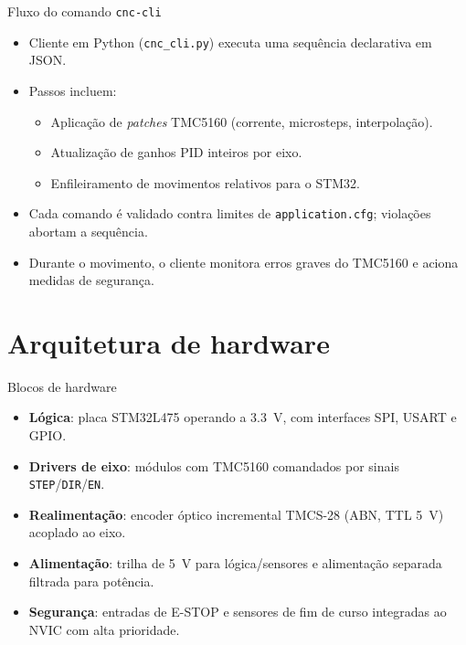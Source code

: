 \documentclass{beamer}
\begin{document}
\begin{frame}{Fluxo do comando \texttt{cnc-cli}}
  \begin{itemize}
    \item Cliente em Python (\texttt{cnc\_cli.py}) executa uma sequência declarativa em JSON.
    \item Passos incluem:
      \begin{itemize}
        \item Aplicação de \emph{patches} TMC5160 (corrente, microsteps, interpolação).
        \item Atualização de ganhos PID inteiros por eixo.
        \item Enfileiramento de movimentos relativos para o STM32.
      \end{itemize}
    \item Cada comando é validado contra limites de \texttt{application.cfg}; violações abortam a sequência.
    \item Durante o movimento, o cliente monitora erros graves do TMC5160 e aciona medidas de segurança.
  \end{itemize}
\end{frame}

\section{Arquitetura de hardware}

\begin{frame}{Blocos de hardware}
  \begin{itemize}
    \item \textbf{Lógica}: placa STM32L475 operando a \SI{3.3}{V}, com interfaces SPI, USART e GPIO.
    \item \textbf{Drivers de eixo}: módulos com TMC5160 comandados por sinais \texttt{STEP}/\texttt{DIR}/\texttt{EN}.
    \item \textbf{Realimentação}: encoder óptico incremental TMCS-28 (ABN, TTL \SI{5}{V}) acoplado ao eixo.
    \item \textbf{Alimentação}: trilha de \SI{5}{V} para lógica/sensores e alimentação separada filtrada para potência.
    \item \textbf{Segurança}: entradas de E-STOP e sensores de fim de curso integradas ao NVIC com alta prioridade.
  \end{itemize}
\end{frame}
\end{document}
